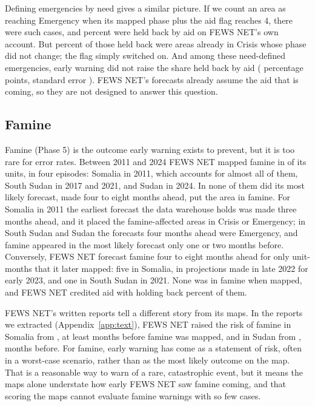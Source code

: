 \documentclass[11pt]{article}
\begin{document}
Defining emergencies by need gives a similar picture. If we count an area as reaching Emergency when its mapped phase plus the aid flag reaches 4, there were \needOnsets{} such cases, and \needHeld{} percent were held back by aid on FEWS NET's own account. But \needHeldSteady{} percent of those held back were areas already in Crisis whose phase did not change; the flag simply switched on. And among these need-defined emergencies, early warning did not raise the share held back by aid (\needEarly{} percentage points, standard error \needEarlySe{}). FEWS NET's forecasts already assume the aid that is coming, so they are not designed to answer this question.

\subsection{Famine}\label{sec:famine}

Famine (Phase 5) is the outcome early warning exists to prevent, but it is too rare for error rates. Between 2011 and 2024 FEWS NET mapped famine in \famMappedUnits{} of its units, in four episodes: Somalia in 2011, which accounts for almost all of them, South Sudan in 2017 and 2021, and Sudan in 2024. In none of them did its most likely forecast, made four to eight months ahead, put the area in famine. For Somalia in 2011 the earliest forecast the data warehouse holds was made three months ahead, and it placed the famine-affected areas in Crisis or Emergency; in South Sudan and Sudan the forecasts four months ahead were Emergency, and famine appeared in the most likely forecast only one or two months before. Conversely, FEWS NET forecast famine four to eight months ahead for only \famWarn{} unit-months that it later mapped: five in Somalia, in projections made in late 2022 for early 2023, and one in South Sudan in 2021. None was in famine when mapped, and FEWS NET credited aid with holding back \famFlag{} percent of them.

FEWS NET's written reports tell a different story from its maps. In the reports we extracted (Appendix~\ref{app:text}), FEWS NET raised the risk of famine in Somalia from \famRiskSo{}, at least \famRiskLeadSo{} months before famine was mapped, and in Sudan from \famRiskSd{}, \famRiskLeadSd{} months before. For famine, early warning has come as a statement of risk, often in a worst-case scenario, rather than as the most likely outcome on the map. That is a reasonable way to warn of a rare, catastrophic event, but it means the maps alone understate how early FEWS NET saw famine coming, and that scoring the maps cannot evaluate famine warnings with so few cases.
\end{document}
